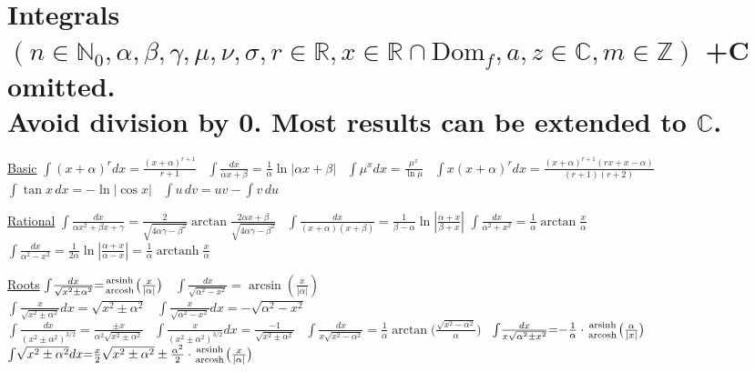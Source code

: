 \section*{Integrals%
\normalfont\scriptsize{$(n\in\mathbb{N}_0,\alpha,\beta,\gamma,\mu,\nu,\sigma,r\in\mathbb{R},x\in\mathbb{R}\cap\mathrm{Dom}_f,a,z\in\mathbb{C},m\in\mathbb{Z})$ +C omitted.}\\ 
\normalfont\scriptsize{Avoid division by 0. Most results can be extended to $\mathbb{C}$.}%
}

\footnotesize{
\underline{Basic} $\int\!(x+\alpha)^rdx{=}\frac{(x+\alpha)^{r+1}}{r+1}$ \ $\int\!\frac{dx}{\alpha x+\beta}{=}\frac{1}{\alpha}\ln|\alpha x+\beta|$ \ $\int\!\mu^xdx{=}\frac{\mu^x}{\ln\mu}$ \ $\int\!x(x+\alpha)^rdx{=}\frac{(x+\alpha)^{r+1}(rx{+}x{-}\alpha)}{(r{+}1)(r{+}2)}$ \ $\int\!\tan x\,dx{=}{-}\ln|\cos x|$ \ $\int\!u\,dv{=}uv{-}\int v\,du$

\underline{Rational} 
$\int\!\frac{dx}{\alpha x^2+\beta x+\gamma}{=}\frac{2}{\sqrt{4\alpha\gamma{-}\beta^2}}\arctan\frac{2\alpha x{+}\beta}{\sqrt{4\alpha\gamma{-}\beta^2}}$ \ $\int\!\frac{dx}{(x{+}\alpha)(x{+}\beta)}{=}\frac{1}{\beta{-}\alpha}\ln|\frac{\alpha{+}x}{\beta{+}x}|$ $\int\!\frac{dx}{\alpha^2+x^2}{=}\frac{1}{\alpha}\arctan\frac{x}{\alpha}$ \ $\int\!\frac{dx}{\alpha^2-x^2}{=}\frac{1}{2\alpha}\ln|\frac{\alpha{+}x}{\alpha{-}x}|{=}\frac{1}{\alpha}\operatorname{arctanh}\frac{x}{\alpha}$  

\underline{Roots}
$\int\!\frac{dx}{\sqrt{x^2\pm\alpha^2}}{=}\genfrac{}{}{0pt}{}{\operatorname{arsinh}}{\operatorname{arcosh}}\big(\frac{x}{|\alpha|}\big)$ \ $\int\!\frac{dx}{\sqrt{\alpha^2{-}x^2}}{=}\arcsin(\frac{x}{|\alpha|})$ \\ $\int\!\frac{x}{\sqrt{x^2\pm\alpha^2}}dx{=}\sqrt{x^2\pm\alpha^2}$ \ $\int\!\frac{x}{\sqrt{\alpha^2{-}x^2}}dx{=}{-}\sqrt{\alpha^2{-}x^2}$\\ 
$\int\!\frac{dx}{(x^2\pm\alpha^2)^{3/2}}{=}\frac{\pm x}{\alpha^2\sqrt{x^2\pm\alpha^2}}$ \ $\int\!\frac{x}{(x^2\pm\alpha^2)^{3/2}}dx{=}\frac{{-}1}{\sqrt{x^2\pm\alpha^2}}$ \
$\int\!\frac{dx}{x\sqrt{x^2{-}\alpha^2}}{=}\frac{1}{\alpha}\operatorname{arctan}\big(\frac{\sqrt{x^2{-}\alpha^2}}{\alpha}\big)$ \ $\int\!\frac{dx}{x\sqrt{\alpha^2\pm x^2}}{=}{-}\frac{1}{\alpha}\cdot\genfrac{}{}{0pt}{}{\operatorname{arsinh}}{\operatorname{arcosh}}\big(\frac{\alpha}{|x|}\big)$
$\int\!\sqrt{x^2\pm\alpha^2}dx{=}\frac{x}{2}\sqrt{x^2\pm\alpha^2}\pm\frac{\alpha^2}{2}\cdot\genfrac{}{}{0pt}{}{\operatorname{arsinh}}{\operatorname{arcosh}}\big(\frac{x}{|\alpha|}\big)$ \


}
